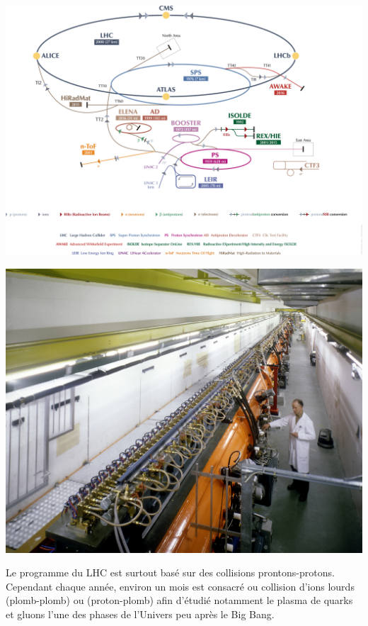 \begin{minipagewithmarginpars}[h]{\textwidth}
  	\centering
	\includegraphics[scale=0.25]{LHC/complexe.png}
  	\label{complexe}
  	\par
  		\marginpar
{
	\includegraphics[width=\marginparwidth]{LHC/linac2.jpg}
    	\label{linac2}
}
\end{minipagewithmarginpars}

Le programme du LHC est surtout basé sur des collisions prontons-protons. Cependant chaque année, environ un mois est consacré ou collision d'ions lourds (plomb-plomb) ou (proton-plomb) afin d'étudié notamment le plasma de quarks et gluons l'une des phases de l'Univers peu après le Big Bang. 

